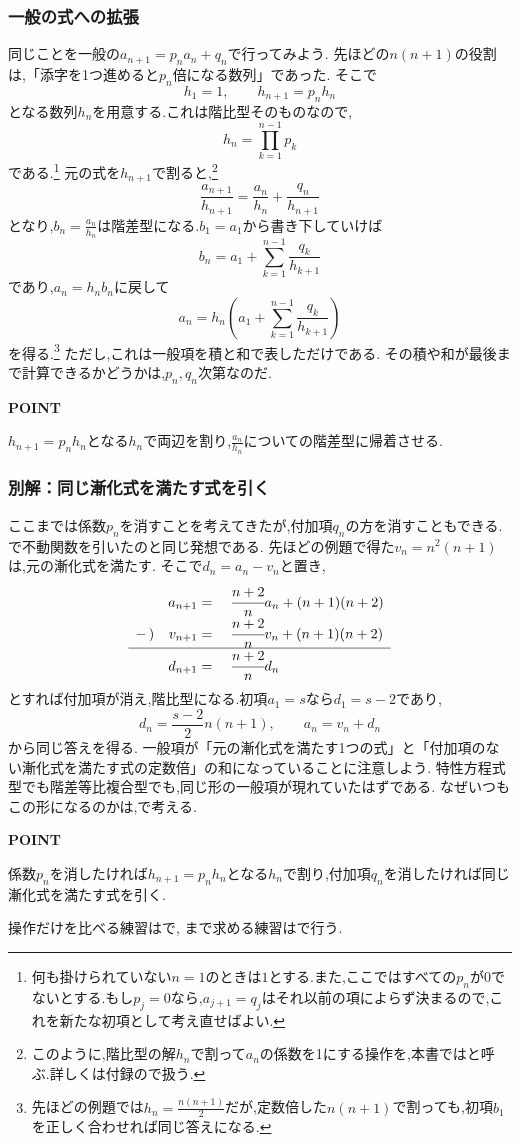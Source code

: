 \subsubsection{一般の式への拡張}
同じことを一般の$a_{n+1}=p_na_n+q_n$で行ってみよう.
先ほどの$n(n+1)$の役割は,「添字を1つ進めると$p_n$倍になる数列」であった.
そこで
\[
  h_1=1,\qquad h_{n+1}=p_nh_n
\]
となる数列$h_n$を用意する.これは階比型そのものなので,
\[
  h_n=\prod_{k=1}^{n-1}p_k
\]
である.\footnote{何も掛けられていない$n=1$のときは$1$とする.また,ここではすべての$p_n$が0でないとする.もし$p_j=0$なら,$a_{j+1}=q_j$はそれ以前の項によらず決まるので,これを新たな初項として考え直せばよい.}
元の式を$h_{n+1}$で割ると,\footnote{このように,階比型の解$h_n$で割って$a_n$の係数を1にする操作を,本書ではと呼ぶ.詳しくは付録ので扱う.}
\[
  \frac{a_{n+1}}{h_{n+1}}=\frac{a_n}{h_n}+\frac{q_n}{h_{n+1}}
\]
となり,$b_n=\frac{a_n}{h_n}$は階差型になる.$b_1=a_1$から書き下していけば
\[
  b_n=a_1+\sum_{k=1}^{n-1}\frac{q_k}{h_{k+1}}
\]
であり,$a_n=h_nb_n$に戻して
\[
  a_n=h_n\left(a_1+\sum_{k=1}^{n-1}\frac{q_k}{h_{k+1}}\right)
\]
を得る.\footnote{先ほどの例題では$h_n=\frac{n(n+1)}{2}$だが,定数倍した$n(n+1)$で割っても,初項$b_1$を正しく合わせれば同じ答えになる.}
ただし,これは一般項を積と和で表しただけである.
その積や和が最後まで計算できるかどうかは,$p_n,q_n$次第なのだ.

\begin{bookpoint}
  \textbf{POINT}\par
  $h_{n+1}=p_nh_n$となる$h_n$で両辺を割り,$\frac{a_n}{h_n}$についての階差型に帰着させる.
\end{bookpoint}

\subsubsection{別解：同じ漸化式を満たす式を引く}
ここまでは係数$p_n$を消すことを考えてきたが,付加項$q_n$の方を消すこともできる.
で不動関数を引いたのと同じ発想である.
先ほどの例題で得た$v_n=n^2(n+1)$は,元の漸化式を満たす.
そこで$d_n=a_n-v_n$と置き,
\[
  \begin{array}{rrl}
    &a_{n+1}={}&\cfrac{n+2}{n}a_n+(n+1)(n+2)\\
    -\,)&v_{n+1}={}&\cfrac{n+2}{n}v_n+(n+1)(n+2)\\ \hline
    &d_{n+1}={}&\cfrac{n+2}{n}d_n
  \end{array}
\]
とすれば付加項が消え,階比型になる.初項$a_1=s$なら$d_1=s-2$であり,
\[
  d_n=\frac{s-2}{2}n(n+1),\qquad a_n=v_n+d_n
\]
から同じ答えを得る.
一般項が「元の漸化式を満たす1つの式」と「付加項のない漸化式を満たす式の定数倍」の和になっていることに注意しよう.
特性方程式型でも階差等比複合型でも,同じ形の一般項が現れていたはずである.
なぜいつもこの形になるのかは,で考える.

\begin{bookpoint}
  \textbf{POINT}\par
  係数$p_n$を消したければ$h_{n+1}=p_nh_n$となる$h_n$で割り,付加項$q_n$を消したければ同じ漸化式を満たす式を引く.
\end{bookpoint}
操作だけを比べる練習はで,
まで求める練習はで行う.
